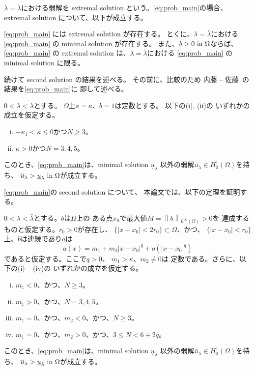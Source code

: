 $\lambda = \bar{\lambda}$における弱解を
extremal solution という。\ref{eq:prob_main}の場合、
extremal solution について、以下が成立する。

\begin{thm} \label{thm:extremal_solution}
 \ref{eq:prob_main} には extremal solution が存在する。
 とくに、$\lambda = \bar{\lambda}$における
 \ref{eq:prob_main} の
 minimal solution が存在する。
 また、$b > 0 ~\text{in}~ \Omega$ならば、\ref{eq:prob_main} の 
 extremal solution は、$\lambda = \bar{\lambda}$における
 \ref{eq:prob_main} の
 minimal solution に限る。
\end{thm}

続けて second solution の結果を述べる。
その前に、比較のため
内藤 -- 佐藤~\cite{MR2886160}の結果を\ref{eq:prob_main}に
即して述べる。

\begin{thm}
 \label{thm:second_solution_naito_sato}
 $0 < \lambda < \bar{\lambda}$とする。
 $\Omega$上$a = \kappa$、$b = 1$は定数とする。
 以下の(i), (ii)の
 いずれかの成立を仮定する。
 \begin{enumerate}[(i)]
  \item $-\kappa_1 < \kappa \leq 0$かつ$N \geq 3$。
  \item $\kappa > 0$かつ$N = 3, 4, 5$。
 \end{enumerate}
 このとき、\ref{eq:prob_main}は、minimal solution
 $\underline{u}_\lambda$
 以外の弱解$\bar{u}_\lambda \in H_0^1(\Omega)$を持ち、
 $\overline{u}_\lambda >
 \underline{u}_\lambda ~\text{in}~ \Omega$が成立する。
\end{thm}

\ref{eq:prob_main}の second solution について、
本論文では、以下の定理を証明する。

\begin{thm} \label{thm:second_solution}
 $0 < \lambda < \bar{\lambda}$とする。$b$は$\Omega$上の
 ある点$x_0$で最大値$M = \left\| b \right\|_{L^\infty(\Omega)} > 0$を
 達成するものと仮定する。$r_0 > 0$が存在し、
 $\{ \lvert x - x_0 \rvert < 2r_0 \} \subset \Omega$、かつ、
 $\{ \lvert x - x_0 \rvert < r_0 \}$上、$b$は連続であり$a$は
 \begin{equation}
  a(x) = m_1 + m_2 \lvert x-x_0 \rvert^{q} 
  + o(\lvert x-x_0 \rvert^{q}) \label{eq:a_q}
 \end{equation}
 であると仮定する。ここで$q > 0$、
 $m_1 > \kappa$、$m_2 \neq 0$は
 定数である。さらに、以下の(i) -- (iv)の
 いずれかの成立を仮定する。
 \begin{enumerate}[(i)]
  \item $m_1 < 0$、かつ、$N \geq 3$。
  \item $m_1 > 0$、かつ、$N = 3, 4, 5$。
  \item $m_1 = 0$、かつ、$m_2 < 0$、かつ、$N \geq 3$。
  \item $m_1 = 0$、かつ、$m_2 > 0$、かつ、$3 \leq N < 6 + 2q$。
 \end{enumerate}
 このとき、\ref{eq:prob_main}は、minimal solution
 $\underline{u}_\lambda$
 以外の弱解$\bar{u}_\lambda \in H_0^1(\Omega)$を持ち、
 $\overline{u}_\lambda >
 \underline{u}_\lambda ~\text{in}~ \Omega$が成立する。
\end{thm}

